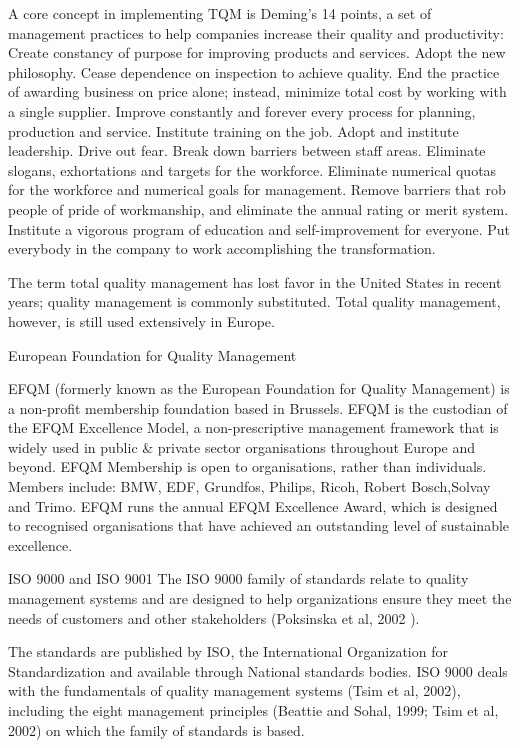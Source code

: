 A core concept in implementing TQM is Deming’s 14 points, a set of management practices to help companies increase their quality and productivity:
Create constancy of purpose for improving products and services.
Adopt the new philosophy.
Cease dependence on inspection to achieve quality.
End the practice of awarding business on price alone; instead, minimize total cost by working with a single supplier.
Improve constantly and forever every process for planning, production and service.
Institute training on the job.
Adopt and institute leadership.
Drive out fear.
Break down barriers between staff areas.
Eliminate slogans, exhortations and targets for the workforce.
Eliminate numerical quotas for the workforce and numerical goals for management.
Remove barriers that rob people of pride of workmanship, and eliminate the annual rating or merit system.
Institute a vigorous program of education and self-improvement for everyone.
Put everybody in the company to work accomplishing the transformation.
 
The term total quality management has lost favor in the United States in recent years; quality management is commonly substituted. Total quality management, however, is still used extensively in Europe.
 
European Foundation for Quality Management
 
EFQM (formerly known as the European Foundation for Quality Management) is a non-profit membership foundation based in Brussels. EFQM is the custodian of the EFQM Excellence Model, a non-prescriptive management framework that is widely used in public & private sector organisations throughout Europe and beyond.
EFQM Membership is open to organisations, rather than individuals. Members include: BMW, EDF, Grundfos, Philips, Ricoh, Robert Bosch,Solvay and Trimo.
EFQM runs the annual EFQM Excellence Award, which is designed to recognised organisations that have achieved an outstanding level of sustainable excellence.
 
ISO 9000 and ISO 9001
The ISO 9000 family of standards relate to quality management systems and are designed to help organizations ensure they meet the needs of customers and other stakeholders (Poksinska et al, 2002 ).
 
The standards are published by ISO, the International Organization for Standardization and available through National standards bodies. 
ISO 9000 deals with the fundamentals of quality management systems (Tsim et al, 2002), including the eight management principles (Beattie and Sohal, 1999; Tsim et al, 2002) 
on which the family of standards is based. 
 
